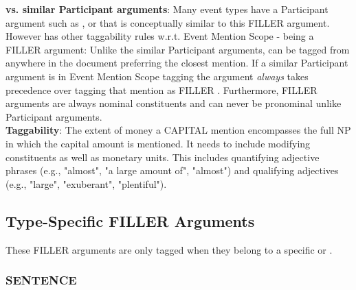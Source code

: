 \noindent\textbf{ vs. similar Participant arguments}:
Many event types have a Participant argument such as ,  or  that is conceptually similar to this FILLER argument.
However  has other taggability rules w.r.t. Event Mention Scope - being a FILLER argument: 
Unlike the similar Participant arguments,  can be tagged from anywhere in the document preferring the closest mention.
If a similar Participant argument is in Event Mention Scope tagging the argument \emph{always} takes precedence over tagging that mention as FILLER .
Furthermore, FILLER arguments are always nominal constituents and can never be pronominal unlike Participant arguments. \\

\noindent\textbf{Taggability}:
The extent of money a CAPITAL mention encompasses the full NP in which the capital amount is mentioned.
It needs to include modifying constituents as well as monetary units.
This includes quantifying adjective phrases (e.g., "almost", "a large amount of", "almost") and qualifying adjectives (e.g., "large", "exuberant", "plentiful").

\begin{exe}
    \ex {}
    \ex {}
    \ex {}
    \ex {}
\end{exe}


\vspace{0.5cm}

\subsection{Type-Specific FILLER Arguments}
These FILLER arguments are only tagged when they belong to a specific  or .

\subsubsection{SENTENCE}

